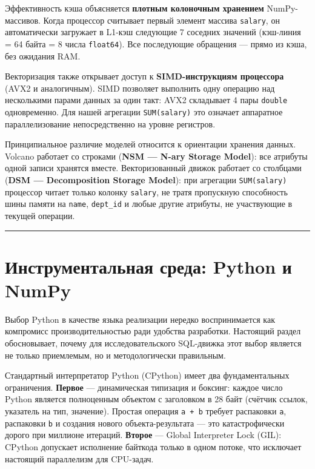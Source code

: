 \documentclass[a4paper,12pt]{report}
\begin{document}
{Эффективность кэша объясняется \textbf{плотным колоночным хранением} NumPy-массивов. Когда процессор считывает первый элемент массива \texttt{salary}, он автоматически загружает в L1-кэш следующие 7 соседних значений (кэш-линия = 64 байта = 8 числа \texttt{float64}). Все последующие обращения — прямо из кэша, без ожидания RAM.

Векторизация также открывает доступ к \textbf{SIMD-инструкциям процессора} (AVX2 и аналогичным). SIMD позволяет выполнить одну операцию над несколькими парами данных за один такт: AVX2 складывает 4 пары \texttt{double} одновременно. Для нашей агрегации \texttt{SUM(salary)} это означает аппаратное параллелизование непосредственно на уровне регистров.

Принципиальное различие моделей относится к ориентации хранения данных. Volcano работает со строками (\textbf{NSM — N-ary Storage Model}): все атрибуты одной записи хранятся вместе. Векторизованный движок работает со столбцами (\textbf{DSM — Decomposition Storage Model}): при агрегации \texttt{SUM(salary)} процессор читает только колонку \texttt{salary}, не тратя пропускную способность шины памяти на \texttt{name}, \texttt{dept\_id} и любые другие атрибуты, не участвующие в текущей операции.

\vspace{0.5cm}\hrule\vspace{0.5cm}

\section{Инструментальная среда: Python и NumPy}

Выбор Python в качестве языка реализации нередко воспринимается как компромисс производительностью ради удобства разработки. Настоящий раздел обосновывает, почему для исследовательского SQL-движка этот выбор является не только приемлемым, но и методологически правильным.

Стандартный интерпретатор Python (CPython) имеет два фундаментальных ограничения. \textbf{Первое} — динамическая типизация и боксинг: каждое число Python является полноценным объектом с заголовком в 28 байт (счётчик ссылок, указатель на тип, значение). Простая операция \texttt{a + b} требует распаковки \texttt{a}, распаковки \texttt{b} и создания нового объекта-результата — это катастрофически дорого при миллионе итераций. \textbf{Второе} — Global Interpreter Lock (GIL): CPython допускает исполнение байткода только в одном потоке, что исключает настоящий параллелизм для CPU-задач.

}
\end{document}
